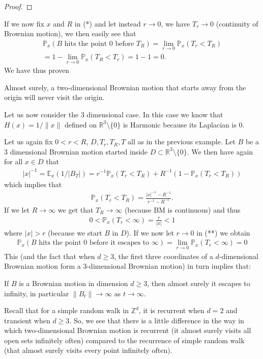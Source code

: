 \documentclass[../mainfile.tex]{subfiles}
\begin{document}
\begin{exmp}
\begin{proof}
\end{proof}
\newpage
If we now fix $x$ and $R$ in (*) and let instead $r \to 0$, we have $T_r \to 0$ (continuity of Brownian motion), we then easily see that
\begin{align*}
\mathbb{P}_x(B \text{ hits the point $0$ before }T_R)= \lim_{r \to 0} \mathbb{P}_x (T_r < T_R) \\ = 1 - \lim_{r \to 0} \mathbb{P}_x(T_R < T_r)=1-1=0.
\end{align*}
We have thus proven
\begin{prop}
Almost surely, a two-dimensional Brownian motion that starts away from the origin will never visit the origin. 
\end{prop}
\end{exmp}
Let us now consider the $3$ dimensional case. In this case we know that $H(x)=1/\|x\|$ defined on $\mathbb{R}^3 \setminus \{0\}$ is Harmonic because its Laplacian is $0$.
\begin{exmp} Let us again fix $0<r<R$, $D, T_r,T_R,T$ all as in the previous example. Let $B$ be a $3$ dimensional Brownian motion started inside $D \subset \mathbb{R}^3 \setminus \{0\}$. We then have again for all $x \in D$ that 
\begin{align*}
|x|^{-1} = \mathbb{E}_x( 1/|B_T|)=  r^{-1} \mathbb{P}_x(T_r < T_R) + R^{-1}(1 - \mathbb{P}_x(T_r < T_R))
\end{align*}
which implies that 
\begin{align*}
\mathbb{P}_x(T_r < T_R) = \frac{|x|^{-1}-R^{-1}}{r^{-1}-R^{-1}}.
\end{align*}
If we let $R \to \infty$ we get that $T_R \to \infty$ (because BM is continuous) and thus \begin{align*}
0< \mathbb{P}_x(T_r < \infty) = \frac{r}{|x|}<1 \tag{**}
\end{align*}
where $|x| >r$ (because we start $B$ in $D$). If we now let $r \to 0$ in (**) we obtain \begin{align*}
\mathbb{P}_x(B \text{ hits the point $0$ before it escapes to $\infty$}) = \lim_{r \to 0} \mathbb{P}_x( T_r < \infty) = 0
\end{align*}
This (and the fact that when $d \geq 3$, the first three coordinates of a $d$-dimensional Brownian motion form a $3$-dimensional Brownian motion) in turn implies that:
\begin{prop}\label{propescinfty} If $B$ is a Brownian motion in dimension $d \geq 3$, then almost surely it escapes to infinity, in particular $\|B_t\| \to \infty$ as $t \to \infty$. 
\end{prop}
\end{exmp}
\begin{rem}Recall that for a simple random walk in $\mathbb{Z}^d$, it is recurrent when $d=2$ and transient when $d \geq 3$. So, we see that there is a little difference in the way in which two-dimensional Brownian motion is recurrent (it almost surely visits all open sets infinitely often) compared to the recurrence of simple random walk (that almost surely visits every point infinitely often). 
\end{rem}
\newpage
\end{document}
